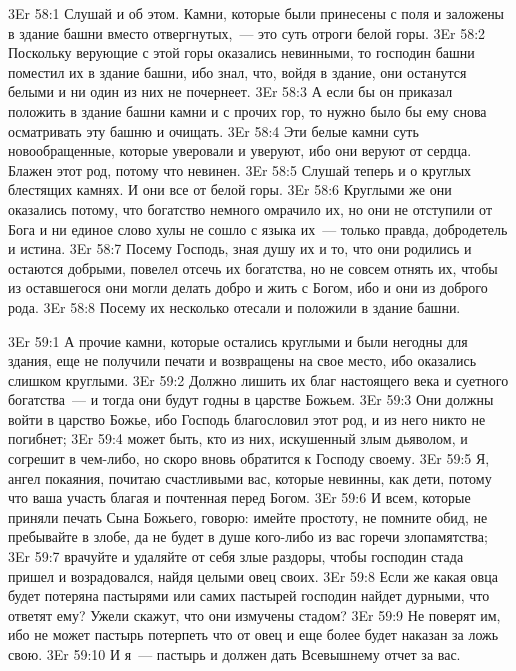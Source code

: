 \vs 3Er 58:1
Слушай и об этом. Камни,
которые были принесены с поля и заложены в здание башни
вместо отвергнутых,~--- это суть отроги белой горы.
\vs 3Er 58:2
Поскольку верующие с этой
горы оказались невинными, то господин башни поместил их в здание башни, ибо
знал, что, войдя в здание, они останутся белыми и ни один из них не почернеет.
\vs 3Er 58:3
А если бы он приказал
положить в здание башни камни и с прочих гор, то нужно было бы ему снова
осматривать эту башню и очищать.
\vs 3Er 58:4
Эти белые камни суть
новообращенные, которые уверовали и уверуют, ибо они веруют от сердца. Блажен
этот род, потому что невинен.
\vs 3Er 58:5
Слушай теперь и о круглых
блестящих камнях. И они все от белой горы.
\vs 3Er 58:6
Круглыми же они оказались
потому, что богатство немного омрачило их, но они не отступили от Бога и ни
единое слово хулы не сошло с языка их~--- только правда, добродетель и истина.
\vs 3Er 58:7
Посему Господь, зная душу
их и то, что они родились и остаются добрыми, повелел отсечь их богатства, но
не совсем отнять их, чтобы из оставшегося они могли делать добро и жить с
Богом, ибо и они из доброго рода.
\vs 3Er 58:8
Посему их несколько
отесали и положили в здание башни.

\vs 3Er 59:1
А прочие камни, которые
остались круглыми и были негодны для здания, еще не получили печати и
возвращены на свое место, ибо оказались слишком круглыми.
\vs 3Er 59:2
Должно лишить их благ
настоящего века и суетного богатства~--- и тогда они будут годны в царстве
Божьем.
\vs 3Er 59:3
Они должны войти в царство
Божье, ибо Господь благословил этот род, и из него никто не погибнет;
\vs 3Er 59:4
может быть, кто из них,
искушенный злым дьяволом, и согрешит в чем-либо, но скоро вновь обратится к
Господу своему.
\vs 3Er 59:5
Я, ангел покаяния, почитаю
счастливыми вас, которые невинны, как дети, потому что ваша участь благая и
почтенная перед Богом.
\vs 3Er 59:6
И всем, которые приняли
печать Сына Божьего, говорю: имейте простоту, не помните обид, не пребывайте в
злобе, да не будет в душе кого-либо из вас горечи злопамятства;
\vs 3Er 59:7
врачуйте и удаляйте от
себя злые раздоры, чтобы господин стада пришел и возрадовался, найдя целыми
овец своих.
\vs 3Er 59:8
Если же какая овца будет
потеряна пастырями или самих пастырей господин найдет дурными, что ответят
ему? Ужели скажут, что они измучены стадом?
\vs 3Er 59:9
Не поверят им, ибо не
может пастырь потерпеть что от овец и еще более будет наказан за ложь свою.
\vs 3Er 59:10
И я~--- пастырь и должен
дать Всевышнему отчет за вас.

